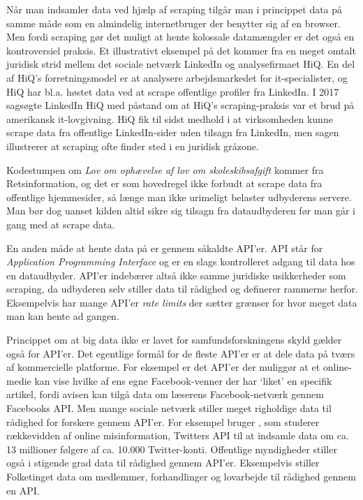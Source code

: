 \documentclass[12pt,]{article}
\begin{document}
Når man indsamler data ved hjælp af scraping tilgår man i princippet
data på samme måde som en almindelig internetbruger der benytter sig af
en browser. Men fordi scraping gør det muligt at hente kolossale
datamængder er det også en kontroversiel praksis. Et illustrativt
eksempel på det kommer fra en meget omtalt juridisk strid mellem det
sociale netværk LinkedIn og analysefirmaet HiQ. En del af HiQ's
forretningsmodel er at analysere arbejdsmarkedet for it-specialister, og
HiQ har bl.a. høstet data ved at scrape offentlige profiler fra
LinkedIn. I 2017 sagsøgte LinkedIn HiQ med påstand om at HiQ's
scraping-praksis var et brud på amerikansk it-lovgivning. HiQ fik til
sidst medhold i at virksomheden kunne scrape data fra offentlige
LinkedIn-sider uden tilsagn fra LinkedIn, men sagen illustrerer at
scraping ofte finder sted i en juridisk gråzone.

Kodestumpen om \emph{Lov om ophævelse af lov om skoleskibsafgift} kommer
fra Retsinformation, og det er som hovedregel ikke forbudt at scrape
data fra offentlige hjemmesider, så længe man ikke urimeligt belaster
udbyderens servere. Man bør dog uanset kilden altid sikre sig tilsagn
fra dataudbyderen før man går i gang med at scrape data.

En anden måde at hente data på er gennem såkaldte API'er. API står for
\emph{Application Programming Interface} og er en slags kontrolleret
adgang til data hos en dataudbyder. API'er indebærer altså ikke samme
juridiske usikkerheder som scraping, da udbyderen selv stiller data til
rådighed og definerer rammerne herfor. Eksempelvis har mange API'er
\emph{rate limits} der sætter grænser for hvor meget data man kan hente
ad gangen.

Princippet om at big data ikke er lavet for samfundsforskningens skyld
gælder også for API'er. Det egentlige formål for de fleste API'er er at
dele data på tværs af kommercielle platforme. For eksempel er det API'er
der muliggør at et online-medie kan vise hvilke af ens egne
Facebook-venner der har `liket' en specifik artikel, fordi avisen kan
tilgå data om læserens Facebook-netværk gennem Facebooks API. Men mange
sociale netværk stiller meget righoldige data til rådighed for forskere
gennem API'er. For eksempel bruger \citet{hjorth2019}, som studerer
rækkevidden af online misinformation, Twitters API til at indsamle data
om ca. 13 millioner følgere af ca. 10.000 Twitter-konti. Offentlige
myndigheder stiller også i stigende grad data til rådighed gennem
API'er. Eksempelvis stiller Folketinget data om medlemmer, forhandlinger
og lovarbejde til rådighed gennem en API.
\end{document}
